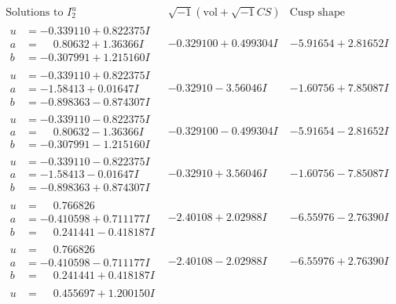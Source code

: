 \documentclass[1p]{elsarticle_modified}
\theoremstyle{definition}
\newcommand{\I}{\sqrt{-1}}
\begin{document}
$$\begin{array}{c|c|c}  
\text{Solutions to }I^u_{2}& \I (\text{vol} + \sqrt{-1}CS) & \text{Cusp shape}\\
 \hline 
\begin{aligned}
u &= -0.339110 + 0.822375 I \\
a &= \phantom{-}0.80632 + 1.36366 I \\
b &= -0.307991 + 1.215160 I\end{aligned}
 & -0.329100 + 0.499304 I & -5.91654 + 2.81652 I \\ \hline\begin{aligned}
u &= -0.339110 + 0.822375 I \\
a &= -1.58413 + 0.01647 I \\
b &= -0.898363 - 0.874307 I\end{aligned}
 & -0.32910 - 3.56046 I & -1.60756 + 7.85087 I \\ \hline\begin{aligned}
u &= -0.339110 - 0.822375 I \\
a &= \phantom{-}0.80632 - 1.36366 I \\
b &= -0.307991 - 1.215160 I\end{aligned}
 & -0.329100 - 0.499304 I & -5.91654 - 2.81652 I \\ \hline\begin{aligned}
u &= -0.339110 - 0.822375 I \\
a &= -1.58413 - 0.01647 I \\
b &= -0.898363 + 0.874307 I\end{aligned}
 & -0.32910 + 3.56046 I & -1.60756 - 7.85087 I \\ \hline\begin{aligned}
u &= \phantom{-}0.766826\phantom{ +0.000000I} \\
a &= -0.410598 + 0.711177 I \\
b &= \phantom{-}0.241441 - 0.418187 I\end{aligned}
 & -2.40108 + 2.02988 I & -6.55976 - 2.76390 I \\ \hline\begin{aligned}
u &= \phantom{-}0.766826\phantom{ +0.000000I} \\
a &= -0.410598 - 0.711177 I \\
b &= \phantom{-}0.241441 + 0.418187 I\end{aligned}
 & -2.40108 - 2.02988 I & -6.55976 + 2.76390 I \\ \hline\begin{aligned}
u &= \phantom{-}0.455697 + 1.200150 I \\

\end{aligned}
\end{array}$$
\end{document}
